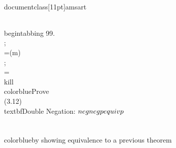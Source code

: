 \\documentclass[11pt]{amsart}
\begin{document}
\\begin{tabbing}
99.\\;\\=(m)\\;\\=\\kill
\\color{blue}Prove\\ (3.12) \\textbf{Double Negation}: $\\neg \\neg p \\equiv p$\\\\
\\color{blue}by showing equivalence to a previous theorem\\\\
\\\\
\end{document}
